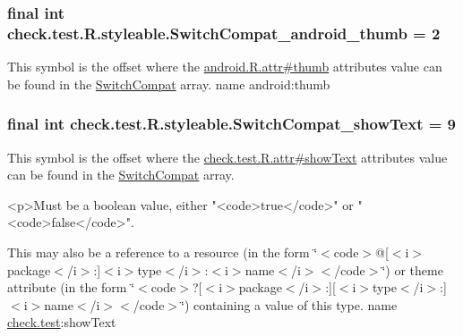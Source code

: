 \subsubsection[{Switch\+Compat\+\_\+android\+\_\+thumb}]{\setlength{\rightskip}{0pt plus 5cm}final int check.\+test.\+R.\+styleable.\+Switch\+Compat\+\_\+android\+\_\+thumb = 2\hspace{0.3cm}{\ttfamily [static]}}\label{classcheck_1_1test_1_1_r_1_1styleable_a22ffd7de92a4d9d0703e1c36ee15e59c}
This symbol is the offset where the \hyperlink{}{android.\+R.\+attr\#thumb} attribute\textquotesingle{}s value can be found in the \hyperlink{classcheck_1_1test_1_1_r_1_1styleable_a0c8f3659ebec12826f8a2493fe43eaf4}{Switch\+Compat} array.  name android\+:thumb \hypertarget{classcheck_1_1test_1_1_r_1_1styleable_a8156a68b3d19ff2ccc3cac1451ba5aa1}{}
\subsubsection[{Switch\+Compat\+\_\+show\+Text}]{\setlength{\rightskip}{0pt plus 5cm}final int check.\+test.\+R.\+styleable.\+Switch\+Compat\+\_\+show\+Text = 9\hspace{0.3cm}{\ttfamily [static]}}\label{classcheck_1_1test_1_1_r_1_1styleable_a8156a68b3d19ff2ccc3cac1451ba5aa1}
This symbol is the offset where the \hyperlink{classcheck_1_1test_1_1_r_1_1attr_af5f8b91a69d2e2925fc0a7c41a279669}{check.\+test.\+R.\+attr\#show\+Text} attribute\textquotesingle{}s value can be found in the \hyperlink{classcheck_1_1test_1_1_r_1_1styleable_a0c8f3659ebec12826f8a2493fe43eaf4}{Switch\+Compat} array.

\begin{DoxyVerb}      <p>Must be a boolean value, either "<code>true</code>" or "<code>false</code>".
\end{DoxyVerb}
 

This may also be a reference to a resource (in the form \char`\"{}$<$code$>$@\mbox{[}$<$i$>$package$<$/i$>$\+:\mbox{]}$<$i$>$type$<$/i$>$\+:$<$i$>$name$<$/i$>$$<$/code$>$\char`\"{}) or theme attribute (in the form \char`\"{}$<$code$>$?\mbox{[}$<$i$>$package$<$/i$>$\+:\mbox{]}\mbox{[}$<$i$>$type$<$/i$>$\+:\mbox{]}$<$i$>$name$<$/i$>$$<$/code$>$\char`\"{}) containing a value of this type.  name \hyperlink{namespacecheck_1_1test}{check.\+test}\+:show\+Text \hypertarget{classcheck_1_1test_1_1_r_1_1styleable_a2209e4bf912668ea5826e5f0fbb4196e}{}
